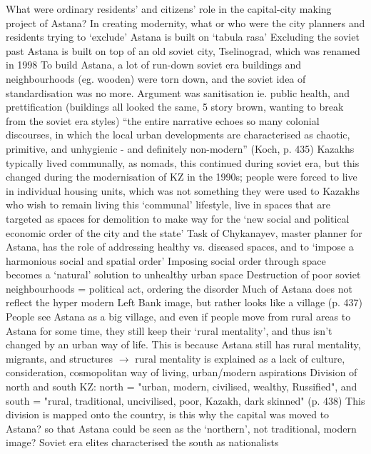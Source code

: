 \documentclass{article}
\begin{document}
\begin{outline}
	\1 What were ordinary residents' and citizens' role in the capital-city making project of Astana?
	\1 In creating modernity, what or who were the city planners and residents trying to `exclude'
	\1 Astana is built on `tabula rasa'
	\1 Excluding the soviet past
		\2 Astana is built on top of an old soviet city, Tselinograd, which was renamed in 1998
		\2 To build Astana, a lot of run-down soviet era buildings and neighbourhoods (eg. wooden) were torn down, and the soviet idea of standardisation was no more. Argument was sanitisation ie. public health, and prettification (buildings all looked the same, 5 story brown, wanting to break from the soviet era styles)
		\2 ``the entire narrative echoes so many colonial discourses, in which the local urban developments are characterised as chaotic, primitive, and unhygienic - and definitely non-modern'' (Koch, p. 435)
		\2 Kazakhs typically lived communally, as nomads, this continued during soviet era, but this changed during the modernisation of KZ in the 1990s; people were forced to live in individual housing units, which was not something they were used to
		\2 Kazakhs who wish to remain living this `communal' lifestyle, live in spaces that are targeted as spaces for demolition to make way for the `new social and political economic order of the city and the state'
	\1 Task of Chykanayev, master planner for Astana, has the role of addressing healthy vs. diseased spaces, and to `impose a harmonious social and spatial order'
		\2 Imposing social order through space becomes a `natural' solution to unhealthy urban space
		\2 Destruction of poor soviet neighbourhoods = political act, ordering the disorder 
	\1 Much of Astana does not reflect the hyper modern Left Bank image, but rather looks like a village (p. 437)
		\2 People see Astana as a big village, and even if people move from rural areas to Astana for some time, they still keep their `rural mentality', and thus isn't changed by an urban way of life. This is because Astana still has rural mentality, migrants, and structures $\rightarrow$ rural mentality is explained as a lack of culture, consideration, cosmopolitan way of living, urban/modern aspirations 
	\1 Division of north and south KZ: north = "urban, modern, civilised, wealthy, Russified", and south = "rural, traditional, uncivilised, poor, Kazakh, dark skinned" (p. 438) 
		\2 This division is mapped onto the country, is this why the capital was moved to Astana? so that Astana could be seen as the `northern', not traditional, modern image?
		\2 Soviet era elites characterised the south as nationalists 
\end{outline}
\end{document}
